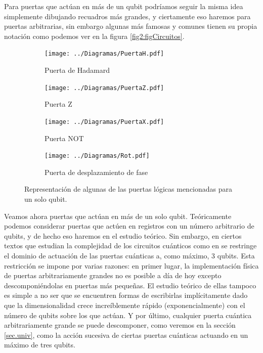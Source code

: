 \documentclass[11pt, spanish]{report}
\numberwithin{equation}{section}
\numberwithin{defin}{section}
\begin{document}
Para puertas que actúan en más de un qubit podríamos seguir la misma idea simplemente dibujando recuadros más grandes, y ciertamente eso haremos para puertas arbitrarias, sin embargo algunas más famosas y comunes tienen su propia notación como podemos ver en la figura \ref{fig2:figCircuitos}.\\

\begin{figure}
\begin{subfigure}{.25\textwidth}
  \centering
  \texttt{[image: ../Diagramas/PuertaH.pdf]}
  \caption{Puerta de Hadamard}
  \label{fig:sfig1}
\end{subfigure}%
\begin{subfigure}{.25\textwidth}
  \centering
  \texttt{[image: ../Diagramas/PuertaZ.pdf]}
  \caption{Puerta Z}
  \label{fig:sfig2}
\end{subfigure}%
\begin{subfigure}{.25\textwidth}
  \centering
  \texttt{[image: ../Diagramas/PuertaX.pdf]}
  \caption{Puerta NOT}
  \label{fig:sfig3}
\end{subfigure}%
\begin{subfigure}{.25\textwidth}
  \centering
  \texttt{[image: ../Diagramas/Rot.pdf]}
  \caption{Puerta de desplazamiento de fase}
  \label{fig:sfig4}
\end{subfigure}
\caption{Representación de algunas de las puertas lógicas mencionadas para un solo qubit.}
\label{fig:figCircuitos}
\end{figure}

Veamos ahora puertas que actúan en más de un solo qubit. Teóricamente podemos considerar puertas que actúen en registros con un número arbitrario de qubits, y de hecho eso haremos en el estudio teórico. Sin embargo, en ciertos textos que estudian la complejidad de los circuitos cuánticos como en \cite{arora2009computational} se restringe el dominio de actuación de las puertas cuánticas a, como máximo, 3 qubits. Esta restricción se impone por varias razones: en primer lugar, la implementación física de puertas arbitrariamente grandes no es posible a día de hoy excepto descomponiéndolas en puertas más pequeñas. El estudio teórico de ellas tampoco es simple a no ser que se encuentren formas de escribirlas implícitamente dado que la dimensionalidad crece increíblemente rápido (exponencialmente) con el número de qubits sobre los que actúan. Y por último, cualquier puerta cuántica arbitrariamente grande se puede descomponer, como veremos en la sección \ref{sec.univ}, como la acción sucesiva de ciertas puertas cuánticas actuando en un máximo de tres qubits. \\
\end{document}
